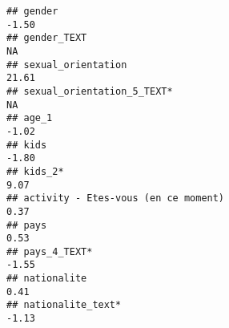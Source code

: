 \documentclass[
]{article}
\begin{document}
\begin{verbatim}
## gender                                                                                                                                                                                                                        -1.50
## gender_TEXT                                                                                                                                                                                                                      NA
## sexual_orientation                                                                                                                                                                                                            21.61
## sexual_orientation_5_TEXT*                                                                                                                                                                                                       NA
## age_1                                                                                                                                                                                                                         -1.02
## kids                                                                                                                                                                                                                          -1.80
## kids_2*                                                                                                                                                                                                                        9.07
## activity - Etes-vous (en ce moment)                                                                                                                                                                                            0.37
## pays                                                                                                                                                                                                                           0.53
## pays_4_TEXT*                                                                                                                                                                                                                  -1.55
## nationalite                                                                                                                                                                                                                    0.41
## nationalite_text*                                                                                                                                                                                                             -1.13

\end{verbatim}
\end{document}
